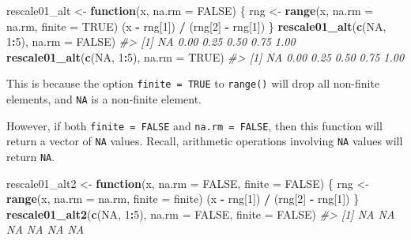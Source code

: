 \documentclass[]{book}
\newenvironment{Shaded}{\begin{snugshade}}{\end{snugshade}}
\newcommand{\CommentTok}[1]{\textcolor[rgb]{0.56,0.35,0.01}{\textit{#1}}}
\newcommand{\ControlFlowTok}[1]{\textcolor[rgb]{0.13,0.29,0.53}{\textbf{#1}}}
\newcommand{\DataTypeTok}[1]{\textcolor[rgb]{0.13,0.29,0.53}{#1}}
\newcommand{\DecValTok}[1]{\textcolor[rgb]{0.00,0.00,0.81}{#1}}
\newcommand{\KeywordTok}[1]{\textcolor[rgb]{0.13,0.29,0.53}{\textbf{#1}}}
\newcommand{\NormalTok}[1]{#1}
\newcommand{\OperatorTok}[1]{\textcolor[rgb]{0.81,0.36,0.00}{\textbf{#1}}}
\newcommand{\OtherTok}[1]{\textcolor[rgb]{0.56,0.35,0.01}{#1}}
\newcommand{\StringTok}[1]{\textcolor[rgb]{0.31,0.60,0.02}{#1}}
\theoremstyle{plain}
\theoremstyle{remark}
\begin{document}
\begin{Shaded}
\begin{Highlighting}[]
\NormalTok{rescale01_alt <-}\StringTok{ }\ControlFlowTok{function}\NormalTok{(x, }\DataTypeTok{na.rm =} \OtherTok{FALSE}\NormalTok{) \{}
\NormalTok{  rng <-}\StringTok{ }\KeywordTok{range}\NormalTok{(x, }\DataTypeTok{na.rm =}\NormalTok{ na.rm, }\DataTypeTok{finite =} \OtherTok{TRUE}\NormalTok{)}
\NormalTok{  (x }\OperatorTok{-}\StringTok{ }\NormalTok{rng[}\DecValTok{1}\NormalTok{]) }\OperatorTok{/}\StringTok{ }\NormalTok{(rng[}\DecValTok{2}\NormalTok{] }\OperatorTok{-}\StringTok{ }\NormalTok{rng[}\DecValTok{1}\NormalTok{])}
\NormalTok{\}}
\KeywordTok{rescale01_alt}\NormalTok{(}\KeywordTok{c}\NormalTok{(}\OtherTok{NA}\NormalTok{, }\DecValTok{1}\OperatorTok{:}\DecValTok{5}\NormalTok{), }\DataTypeTok{na.rm =} \OtherTok{FALSE}\NormalTok{)}
\CommentTok{#> [1]   NA 0.00 0.25 0.50 0.75 1.00}
\KeywordTok{rescale01_alt}\NormalTok{(}\KeywordTok{c}\NormalTok{(}\OtherTok{NA}\NormalTok{, }\DecValTok{1}\OperatorTok{:}\DecValTok{5}\NormalTok{), }\DataTypeTok{na.rm =} \OtherTok{TRUE}\NormalTok{)}
\CommentTok{#> [1]   NA 0.00 0.25 0.50 0.75 1.00}
\end{Highlighting}
\end{Shaded}

This is because the option \texttt{finite\ =\ TRUE} to \texttt{range()}
will drop all non-finite elements, and \texttt{NA} is a non-finite
element.

However, if both \texttt{finite\ =\ FALSE} and \texttt{na.rm\ =\ FALSE},
then this function will return a vector of \texttt{NA} values. Recall,
arithmetic operations involving \texttt{NA} values will return
\texttt{NA}.

\begin{Shaded}
\begin{Highlighting}[]
\NormalTok{rescale01_alt2 <-}\StringTok{ }\ControlFlowTok{function}\NormalTok{(x, }\DataTypeTok{na.rm =} \OtherTok{FALSE}\NormalTok{, }\DataTypeTok{finite =} \OtherTok{FALSE}\NormalTok{) \{}
\NormalTok{  rng <-}\StringTok{ }\KeywordTok{range}\NormalTok{(x, }\DataTypeTok{na.rm =}\NormalTok{ na.rm, }\DataTypeTok{finite =}\NormalTok{ finite)}
\NormalTok{  (x }\OperatorTok{-}\StringTok{ }\NormalTok{rng[}\DecValTok{1}\NormalTok{]) }\OperatorTok{/}\StringTok{ }\NormalTok{(rng[}\DecValTok{2}\NormalTok{] }\OperatorTok{-}\StringTok{ }\NormalTok{rng[}\DecValTok{1}\NormalTok{])}
\NormalTok{\}}
\KeywordTok{rescale01_alt2}\NormalTok{(}\KeywordTok{c}\NormalTok{(}\OtherTok{NA}\NormalTok{, }\DecValTok{1}\OperatorTok{:}\DecValTok{5}\NormalTok{), }\DataTypeTok{na.rm =} \OtherTok{FALSE}\NormalTok{, }\DataTypeTok{finite =} \OtherTok{FALSE}\NormalTok{)}
\CommentTok{#> [1] NA NA NA NA NA NA}
\end{Highlighting}
\end{Shaded}
\end{document}
